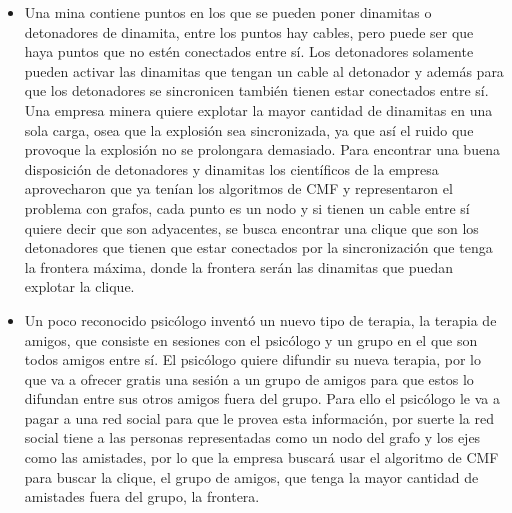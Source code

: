 \begin{itemize}
\item Una mina contiene puntos en los que se pueden poner dinamitas o detonadores de dinamita, entre los puntos hay cables, pero puede ser que haya puntos que no estén conectados entre sí. Los detonadores solamente pueden activar las dinamitas que tengan un cable al detonador y además para que los detonadores se sincronicen también tienen
estar conectados entre sí. Una empresa minera quiere explotar la mayor cantidad de dinamitas en una sola carga, osea que la explosión sea sincronizada, ya que así el ruido que provoque la explosión no se prolongara demasiado. Para encontrar una buena disposición de detonadores y dinamitas los científicos de la empresa aprovecharon que ya tenían los algoritmos de CMF y representaron el problema con grafos, cada punto es un nodo y si tienen un cable entre sí quiere decir que son adyacentes, se busca encontrar una clique que son los detonadores que tienen que estar conectados por la sincronización que tenga la frontera máxima, donde la frontera serán las dinamitas que puedan explotar la clique. 
 
\item Un poco reconocido psicólogo inventó un nuevo tipo de terapia, la terapia de amigos, que consiste en sesiones con el psicólogo y un grupo en el que son todos amigos entre sí. El psicólogo quiere difundir su nueva terapia, por lo que va a ofrecer gratis una sesión a un grupo de amigos para que estos lo difundan entre sus otros amigos fuera del grupo. Para ello el psicólogo le va a pagar a una red social para que le provea esta información, por suerte la red social tiene a las personas representadas como un nodo del grafo y los ejes como las amistades, por lo que la empresa buscará usar el algoritmo de CMF para buscar la clique, el grupo de amigos, que tenga la mayor cantidad de amistades fuera del grupo, la frontera.

\end{itemize}


